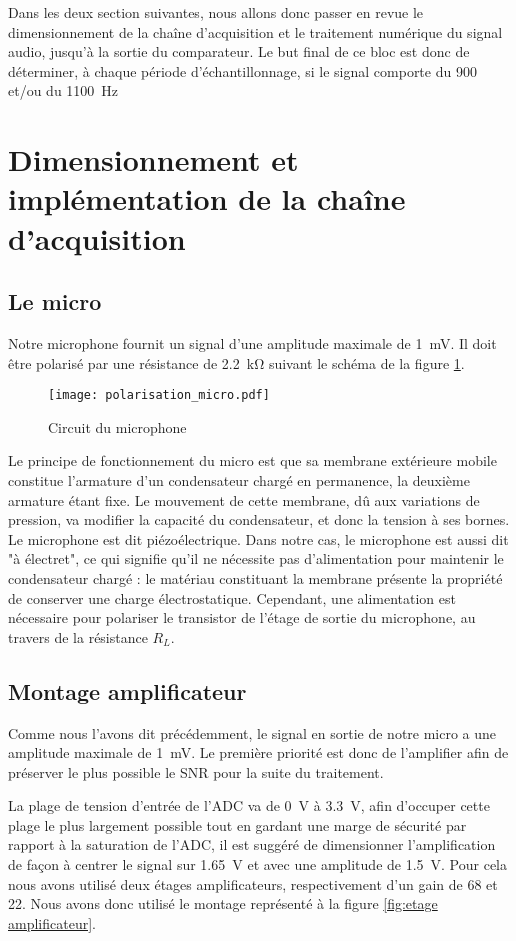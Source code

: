 Dans les deux section suivantes, nous allons donc passer en revue le dimensionnement de la chaîne d'acquisition et le traitement numérique du signal audio, jusqu'à la sortie du comparateur. Le but final de ce bloc est donc de déterminer, à chaque période d'échantillonnage, si le signal comporte du 900 et/ou du \SI{1100}{\hertz}

\section{Dimensionnement et implémentation de la chaîne d'acquisition}

\subsection{Le micro}
Notre microphone fournit un signal d'une amplitude maximale de \SI{1}{\milli\volt}. Il doit être polarisé par une résistance de \SI{2.2}{\kilo\ohm} suivant le schéma de la figure \ref{fig:polarisation du micro}.
\begin{figure}[htbp]
\centering
\texttt{[image: polarisation\_micro.pdf]}
\caption{Circuit du microphone}
\label{fig:polarisation du micro}
\end{figure}

Le principe de fonctionnement du micro est que sa membrane extérieure mobile constitue l'armature d'un condensateur chargé en permanence, la deuxième armature étant fixe. Le mouvement de cette membrane, dû aux variations de pression, va modifier la capacité du condensateur, et donc la tension à ses bornes. Le microphone est dit piézoélectrique. Dans notre cas, le microphone est aussi dit "à électret", ce qui signifie qu'il ne nécessite pas d'alimentation pour maintenir le condensateur chargé : le matériau constituant la membrane présente la propriété de conserver une charge électrostatique. Cependant, une alimentation est nécessaire pour polariser le transistor de l'étage de sortie du microphone, au travers de la résistance $R_L$.

\subsection{Montage amplificateur}
Comme nous l'avons dit précédemment, le signal en sortie de notre micro a une amplitude maximale de \SI{1}{\milli\volt}. Le première priorité est donc de l'amplifier afin de préserver le plus possible le SNR pour la suite du traitement.

La plage de tension d'entrée de l'ADC va de \SI{0}{\volt} à \SI{3.3}{\volt}, afin d'occuper cette plage le plus largement possible tout en gardant une marge de sécurité par rapport à la saturation de l'ADC, il est suggéré de dimensionner l'amplification  de façon à centrer le signal sur \SI{1.65}{\volt} et avec une amplitude de \SI{1.5}{\volt}. Pour cela nous avons utilisé deux étages amplificateurs, respectivement d'un gain de 68 et 22. Nous avons donc utilisé le montage représenté à la figure \ref{fig:etage amplificateur}.

